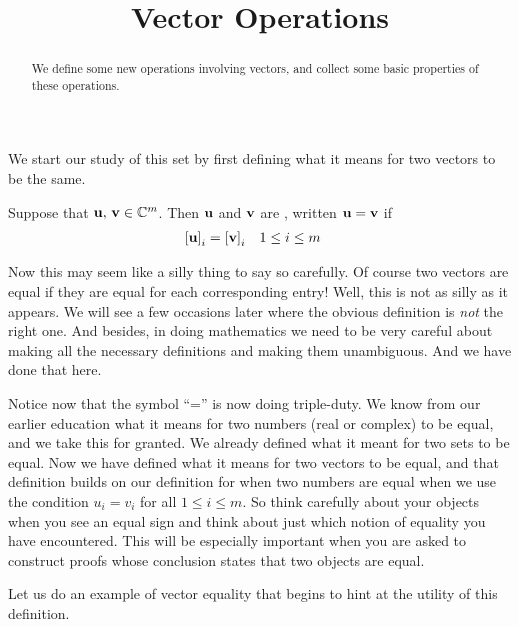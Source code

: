 \documentclass{ximera}
\title{Vector Operations}
\begin{document}
\begin{abstract}
  We define some new operations involving vectors, and collect some basic properties of these operations.
\end{abstract}
\maketitle

We start our study of this set by first defining what it means for two vectors to be the same.

\begin{definition}
Suppose that $\mathbf{u},\,\mathbf{v}\in\mathbb{C}^{m}$.  Then $\mathbf{u}$ and $\mathbf{v}$ are , written $\mathbf{u}=\mathbf{v}$ if
\begin{align*}
\left\lbrack\mathbf{u}\right\rbrack_{i}&=\left\lbrack\mathbf{v}\right\rbrack_{i}
&&1\leq i\leq m
\end{align*}
\end{definition}

Now this may seem like a silly thing to say so carefully.  Of course
two vectors are equal if they are equal for each corresponding entry!
Well, this is not as silly as it appears.  We will see a few occasions
later where the obvious definition is \textit{not} the right one.  And
besides, in doing mathematics we need to be very careful about making
all the necessary definitions and making them unambiguous.  And we
have done that here.

Notice now that the symbol ``='' is now doing triple-duty.  We know
from our earlier education what it means for two numbers (real or
complex) to be equal, and we take this for granted.  We already
defined what it meant for two sets to be equal.  Now we have defined
what it means for two vectors to be equal, and that definition builds
on our definition for when two numbers are equal when we use the
condition $u_i=v_i$ for all $1\leq i\leq m$.  So think carefully about
your objects when you see an equal sign and think about just which
notion of equality you have encountered.  This will be especially
important when you are asked to construct proofs whose conclusion
states that two objects are equal.

Let us do an example of vector equality that begins to hint at the
utility of this definition.
\end{document}
